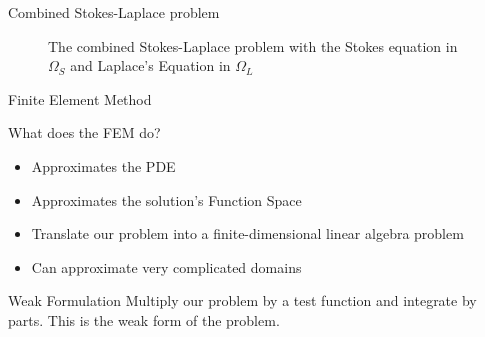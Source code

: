 \documentclass{beamer}
\theoremstyle{definition}
\begin{document}
\begin{frame}{Combined Stokes-Laplace problem}
\begin{figure}[H]
\begin{center}
	\end{center}
	\caption{The combined Stokes-Laplace problem with the Stokes equation in $\Omega_S$ and Laplace's Equation in $\Omega_L$}
	\label{combi}
\end{figure}
\end{frame}


  \begin{frame}{Finite Element Method}
  \begin{block}{What does the FEM do?}
  \begin{itemize}
\item Approximates the PDE
\item Approximates the solution's Function Space
\item Translate our problem into a finite-dimensional linear algebra problem
\item Can approximate very complicated domains
  \end{itemize}
  \end{block}

\begin{block}{Weak Formulation}
Multiply our problem by a test function and integrate by parts.  This is the weak form of the problem.
\end{block}
\end{frame}
\end{document}
